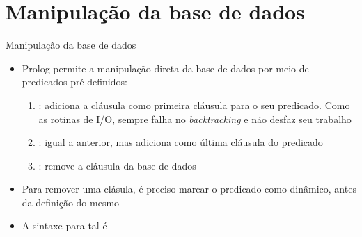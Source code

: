 \section{Manipulação da base de dados}

\begin{frame}[fragile]{Manipulação da base de dados}

    \begin{itemize}
        \item Prolog permite a manipulação direta da base de dados por meio de predicados 
            pré-definidos:

        \begin{enumerate}
            \item {}: adiciona a cláusula  como primeira 
            cláusula para o seu predicado. Como as rotinas de I/O, sempre falha no 
            \textit{backtracking} e não desfaz seu trabalho

            \item {}: igual a anterior, mas adiciona como última 
                cláusula do predicado

            \item {}: remove a cláusula  da base de dados
        \end{enumerate}

        \item Para remover uma clásula, é preciso marcar o predicado como dinâmico, antes da 
            definição do mesmo

        \item A sintaxe para tal é


    \end{itemize}

\end{frame}

